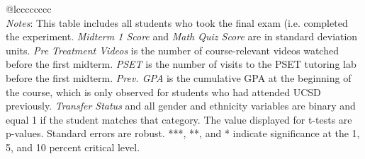 \begin{tabular}{@{\extracolsep{5pt}}lcccccccc}
\hline \hline \\[-1.8ex]
{\textit{Notes}: This table includes all students who took the final exam (i.e. completed the  experiment.  \textit{Midterm 1 Score} and \textit{Math Quiz Score} are in standard  deviation units. \textit{Pre Treatment Videos} is the number of course-relevant  videos watched before the first midterm. \textit{PSET} is the number of visits  to the PSET tutoring lab before the first midterm. \textit{Prev. GPA} is the cumulative  GPA at the beginning of the course, which is only observed for students who had attended  UCSD previously. \textit{Transfer Status} and all gender and ethnicity variables  are binary and equal 1 if the student matches that category.  The value displayed for t-tests are p-values. Standard errors are robust. ***, **, and * indicate significance at the 1, 5, and 10 percent critical level. }
\end{tabular}
